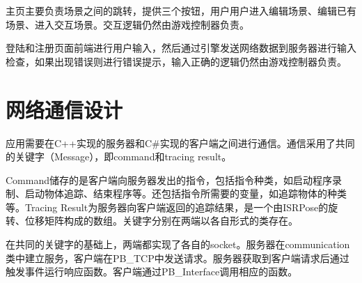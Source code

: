 主页主要负责场景之间的跳转，提供三个按钮，用户用户进入编辑场景、编辑已有场景、进入交互场景。交互逻辑仍然由游戏控制器负责。

登陆和注册页面前端进行用户输入，然后通过引擎发送网络数据到服务器进行输入检查，如果出现错误则进行错误提示，输入正确的逻辑仍然由游戏控制器负责。

\section{网络通信设计}

应用需要在C++实现的服务器和C\#实现的客户端之间进行通信。通信采用了共同的关键字（Message），即command和tracing result。

Command储存的是客户端向服务器发出的指令，包括指令种类，如启动程序录制、启动物体追踪、结束程序等。还包括指令所需要的变量，如追踪物体的种类等。Tracing Result为服务器向客户端返回的追踪结果，是一个由ISRPose的旋转、位移矩阵构成的数组。关键字分别在两端以各自形式的类存在。

在共同的关键字的基础上，两端都实现了各自的socket。服务器在communication类中建立服务，客户端在PB\_TCP中发送请求。服务器获取到客户端请求后通过触发事件运行响应函数。客户端通过PB\_Interface调用相应的函数。
